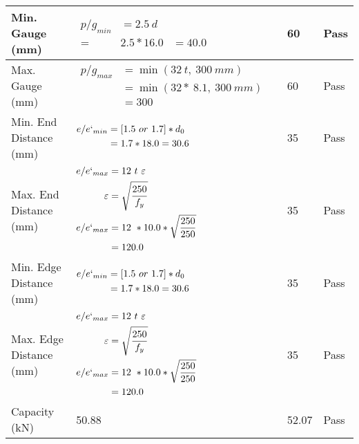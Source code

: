 \documentclass{article}%
\begin{document}
\begin{longtable}{|p{4cm}|p{5cm}|p{5.5cm}|p{1.5cm}|}
\hline%
Min. Gauge (mm)&$\begin{aligned}p/g_{min}&= 2.5 ~ d&\\ =&2.5*16.0&=40.0\end{aligned}$&60&Pass\\%
\hline%
Max. Gauge (mm)&$\begin{aligned}p/g_{max} &=\min(32~t,~300~mm)&\\ &=\min(32 *~8.1,~ 300 ~mm)\\&=300\end{aligned}$&60&Pass\\%
\hline%
Min. End Distance (mm)&$\begin{aligned}e/e`_{min} &=[1.5~or~ 1.7] * d_0\\ &=1.7*18.0=30.6 \end{aligned}$&35&Pass\\%
\hline%
Max. End Distance (mm)&$\begin{aligned}e/e`_{max} &= 12~ t~ \varepsilon&\\ \varepsilon &= \sqrt{\frac{250}{f_y}}\\ e/e`_{max}&=12 ~*10.0*\sqrt{\frac{250}{250}}\\ &=120.0\\ \end{aligned}$&35&Pass\\%
\hline%
Min. Edge Distance (mm)&$\begin{aligned}e/e`_{min} &=[1.5~or~ 1.7] * d_0\\ &=1.7*18.0=30.6 \end{aligned}$&35&Pass\\%
\hline%
Max. Edge Distance (mm)&$\begin{aligned}e/e`_{max} &= 12~ t~ \varepsilon&\\ \varepsilon &= \sqrt{\frac{250}{f_y}}\\ e/e`_{max}&=12 ~*10.0*\sqrt{\frac{250}{250}}\\ &=120.0\\ \end{aligned}$&35&Pass\\%
\hline%
Capacity (kN)&50.88&52.07&Pass\\%
\hline%
\end{longtable}

%
\newpage%
\end{document}
